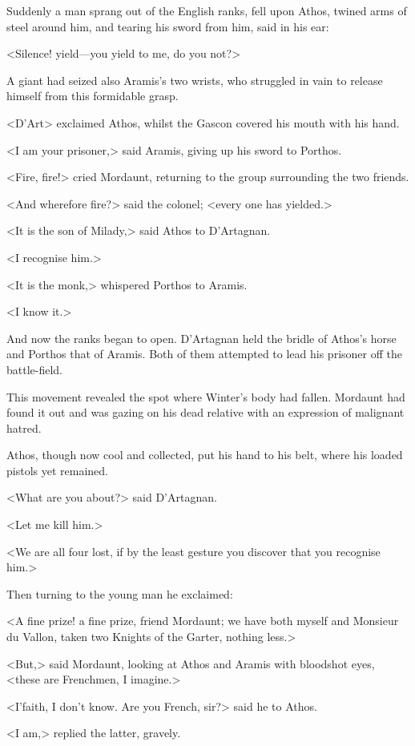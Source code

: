 Suddenly a man sprang out of the English ranks, fell upon Athos, twined arms of steel around him, and tearing his sword from him, said in his ear:

<Silence! yield—you yield to me, do you not?>

A giant had seized also Aramis's two wrists, who struggled in vain to release himself from this formidable grasp.

<D'Art\longdash> exclaimed Athos, whilst the Gascon covered his mouth with his hand.

<I am your prisoner,> said Aramis, giving up his sword to Porthos.

<Fire, fire!> cried Mordaunt, returning to the group surrounding the two friends.

<And wherefore fire?> said the colonel; <every one has yielded.>

<It is the son of Milady,> said Athos to D'Artagnan.

<I recognise him.>

<It is the monk,> whispered Porthos to Aramis.

<I know it.>

And now the ranks began to open. D'Artagnan held the bridle of Athos's horse and Porthos that of Aramis. Both of them attempted to lead his prisoner off the battle-field.

This movement revealed the spot where Winter's body had fallen. Mordaunt had found it out and was gazing on his dead relative with an expression of malignant hatred.

Athos, though now cool and collected, put his hand to his belt, where his loaded pistols yet remained.

<What are you about?> said D'Artagnan.

<Let me kill him.>

<We are all four lost, if by the least gesture you discover that you recognise him.>

Then turning to the young man he exclaimed:

<A fine prize! a fine prize, friend Mordaunt; we have both myself and Monsieur du Vallon, taken two Knights of the Garter, nothing less.>

<But,> said Mordaunt, looking at Athos and Aramis with bloodshot eyes, <these are Frenchmen, I imagine.>

<I'faith, I don't know. Are you French, sir?> said he to Athos.

<I am,> replied the latter, gravely.

